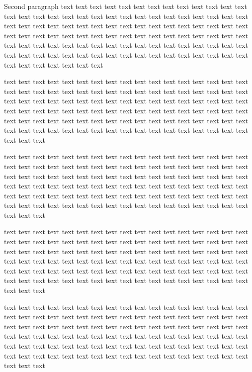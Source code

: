 \documentclass[twocolumn, 10pt, a4paper]{memoir}
\begin{document}
Second paragraph 
text text text text text text text text text text text text text text text text text text text text text
text text text text text text text text text text text text text text text text text text text text text
text text text text text text text text text text text text text text text text text text text text text
text text text text text text text text text text text text text text text text text text text text text
text text text text text text text text text text text text text text text text text text text text text

text text text text text text text text text text text text text text text text text text text text text
text text text text text text text text text text text text text text text text text text text text text
text text text text text text text text text text text text text text text text text text text text text
text text text text text text text text text text text text text text text text text text text text text
text text text text text text text text text text text text text text text text text text text text text

text text text text text text text text text text text text text text text text text text text text text
text text text text text text text text text text text text text text text text text text text text text
text text text text text text text text text text text text text text text text text text text text text
text text text text text text text text text text text text text text text text text text text text text
text text text text text text text text text text text text text text text text text text text text text

text text text text text text text text text text text text text text text text text text text text text
text text text text text text text text text text text text text text text text text text text text text
text text text text text text text text text text text text text text text text text text text text text
text text text text text text text text text text text text text text text text text text text text text
text text text text text text text text text text text text text text text text text text text text text

text text text text text text text text text text text text text text text text text text text text text
text text text text text text text text text text text text text text text text text text text text text
text text text text text text text text text text text text text text text text text text text text text
text text text text text text text text text text text text text text text text text text text text text
text text text text text text text text text text text text text text text text text text text text text
\end{document}
